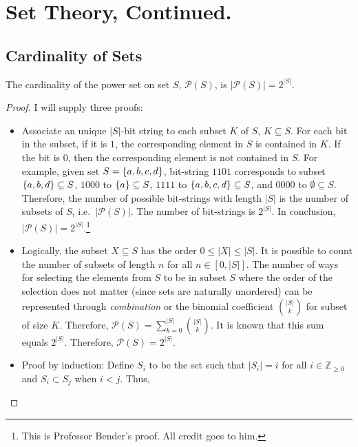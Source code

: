 
\section{Set Theory, Continued.}

\subsection{Cardinality of Sets}

\begin{proposition}
    The cardinality of the power set on set \(S\), \(\mathcal{P}(S)\), is \(|\mathcal{P}(S)|=2^{|S|}\).
\end{proposition}
\begin{proof}
    I will supply three proofs:
    \begin{itemize}
        \item Associate an unique \(|S|\)-bit string to each subset \(K\) of \(S\), \(K\subseteq S\). For each bit in the subset, if it is \(1\), the corresponding element in
        \(S\) is contained in \(K\). If the bit is \(0\), then the corresponding element is not contained in \(S\). For example, given set \(S=\{a,b,c,d\}\), bit-string \(1101\)
        corresponds to subset \(\{a,b,d\}\subseteq S\), \(1000\) to \(\{a\}\subseteq S\), \(1111\) to \(\{a,b,c,d\}\subseteq S\), and \(0000\) to \(\emptyset\subseteq S\).
        Therefore, the number of possible bit-strings with length \(|S|\) is the number of subsets of \(S\), i.e.\ \(|\mathcal{P}(S)|\). The number of bit-strings is \(2^{|S|}\).
        In conclusion, \(|\mathcal{P}(S)|=2^{|S|}\).\footnote{This is Professor Bender's proof. All credit goes to him.}
        \item Logically, the subset \(X\subseteq S\) has the order \(0\le|X|\le|S|\). It is possible to count the number of subsets of length \(n\) for all \(n\in[0,|S|]\).
        The number of ways for selecting the elements from \(S\) to be in subset \(S\) where the order of the selection does not matter (since sets are naturally unordered) 
        can be represented through \emph{combination} or the binomial coefficient \(\binom{|S|}{k}\) for subset of size \(K\). Therefore, 
        \(\mathcal{P}(S)=\sum_{k=0}^{|S|}\binom{|S|}{k}\). It is known that this sum equals \(2^{|S|}\). Therefore, \(\mathcal{P}(S)=2^{|S|}\).
        \item Proof by induction: Define \(S_i\) to be the set such that \(|S_i|=i\) for all \(i\in\mathbb{Z}_{\ge0}\) and \(S_i\subset S_j\) when \(i<j\). Thus, 

\end{itemize}
\end{proof}
